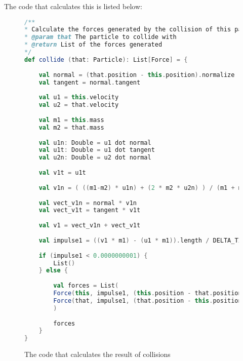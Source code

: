 	The code that calculates this is listed below:
	
	\begin{figure}[h]
		\centering
		\begin{lstlisting}[language=Scala]
/**
* Calculate the forces generated by the collision of this particle and another
* @param that The particle to collide with
* @return List of the forces generated
*/
def collide (that: Particle): List[Force] = {
	
	val normal = (that.position - this.position).normalize
	val tangent = normal.tangent
	
	val u1 = this.velocity
	val u2 = that.velocity
	
	val m1 = this.mass
	val m2 = that.mass
	
	val u1n: Double = u1 dot normal
	val u1t: Double = u1 dot tangent
	val u2n: Double = u2 dot normal
	
	val v1t = u1t
	
	val v1n = ( ((m1-m2) * u1n) + (2 * m2 * u2n) ) / (m1 + m2)
	
	val vect_v1n = normal * v1n
	val vect_v1t = tangent * v1t
	
	val v1 = vect_v1n + vect_v1t
	
	val impulse1 = ((v1 * m1) - (u1 * m1)).length / DELTA_TIME
	
	if (impulse1 < 0.0000000001) {
		List()
	} else {
	
		val forces = List(
		Force(this, impulse1, (this.position - that.position).theta, alwaysDraw = true),
		Force(that, impulse1, (that.position - this.position).theta, alwaysDraw = true)
		)
		
		forces
	}
}
		\end{lstlisting}
		\caption{The code that calculates the result of collisions}
		\label{fig:collCode}
	\end{figure}

